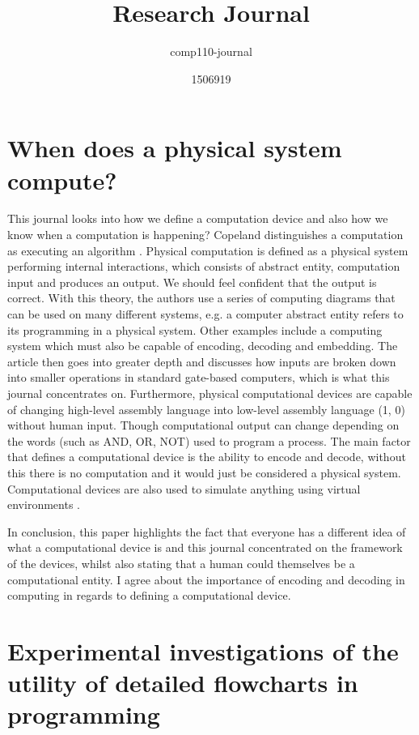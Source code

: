 \documentclass{scrartcl}
\title{Research Journal}
\subtitle{comp110-journal}
\author{1506919}
\begin{document}
\maketitle

\section{When does a physical system compute?}

This journal looks into how we define a computation device and also how we know when a computation is happening? Copeland distinguishes a computation as executing an algorithm \cite{copeland1996computation}.  Physical computation is defined as a physical system performing internal interactions, which consists of abstract entity, computation input and produces an output. We should feel confident that the output is correct. With this theory, the authors use a series of computing diagrams that can be used on many different systems, e.g. a computer abstract entity refers to its programming in a physical system. Other examples include a computing system which must also be capable of encoding, decoding and embedding. The article then goes into greater depth and discusses how inputs are broken down into smaller operations in standard gate-based computers, which is what this journal concentrates on. Furthermore, physical computational devices are capable of changing high-level assembly language into low-level assembly language (1, 0) without human input. Though computational output can change depending on the words (such as AND, OR, NOT) used to program a process. The main factor that defines a computational device is the ability to encode and decode, without this there is no computation and it would just be considered a physical system. Computational devices are also used to simulate anything using virtual environments \cite{horsman2014does}.

In conclusion, this paper highlights the fact that everyone has a different idea of what a computational device is and this journal concentrated on the framework of the devices, whilst also stating that a human could themselves be a computational entity. I agree about the importance of encoding and decoding in computing in regards to defining a computational device.

\section{Experimental investigations of the utility of detailed flowcharts in programming}
\end{document}
